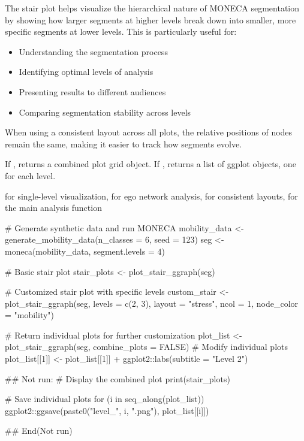 \documentclass[a4paper]{book}
\begin{document}
%
\begin{Details}
The stair plot helps visualize the hierarchical nature of MONECA segmentation
by showing how larger segments at higher levels break down into smaller, more
specific segments at lower levels. This is particularly useful for:
\begin{itemize}

\item{} Understanding the segmentation process
\item{} Identifying optimal levels of analysis
\item{} Presenting results to different audiences
\item{} Comparing segmentation stability across levels

\end{itemize}


When using a consistent layout across all plots, the relative positions of
nodes remain the same, making it easier to track how segments evolve.
\end{Details}
%
\begin{Value}
If , returns a combined plot grid object.
If , returns a list of ggplot objects, one for each level.
\end{Value}
%
\begin{SeeAlso}
 for single-level visualization,
 for ego network analysis,
 for consistent layouts,
 for the main analysis function
\end{SeeAlso}
%
\begin{Examples}
\begin{ExampleCode}
# Generate synthetic data and run MONECA
mobility_data <- generate_mobility_data(n_classes = 6, seed = 123)
seg <- moneca(mobility_data, segment.levels = 4)

# Basic stair plot
stair_plots <- plot_stair_ggraph(seg)

# Customized stair plot with specific levels
custom_stair <- plot_stair_ggraph(seg, 
                                 levels = c(2, 3),
                                 layout = "stress",
                                 ncol = 1,
                                 node_color = "mobility")

# Return individual plots for further customization
plot_list <- plot_stair_ggraph(seg, combine_plots = FALSE)
# Modify individual plots
plot_list[[1]] <- plot_list[[1]] + ggplot2::labs(subtitle = "Level 2")

## Not run: 
# Display the combined plot
print(stair_plots)

# Save individual plots
for (i in seq_along(plot_list)) {
  ggplot2::ggsave(paste0("level_", i, ".png"), plot_list[[i]])
}

## End(Not run)

\end{ExampleCode}
\end{Examples}
\end{document}
